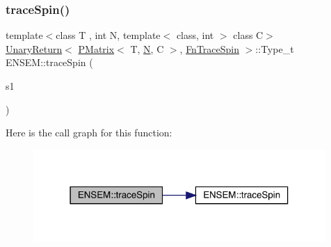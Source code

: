 \subsubsection{\texorpdfstring{traceSpin()}{traceSpin()}}
{\footnotesize\ttfamily template$<$class T , int N, template$<$ class, int $>$ class C$>$ \\
\mbox{\hyperlink{structENSEM_1_1UnaryReturn}{Unary\+Return}}$<$ \mbox{\hyperlink{classENSEM_1_1PMatrix}{P\+Matrix}}$<$ T, \mbox{\hyperlink{adat__devel_2lib_2hadron_2operator__name__util_8cc_a7722c8ecbb62d99aee7ce68b1752f337}{N}}, C $>$, \mbox{\hyperlink{structENSEM_1_1FnTraceSpin}{Fn\+Trace\+Spin}} $>$\+::Type\+\_\+t E\+N\+S\+E\+M\+::trace\+Spin (\begin{DoxyParamCaption}\item[{const \mbox{\hyperlink{classENSEM_1_1PMatrix}{P\+Matrix}}$<$ T, \mbox{\hyperlink{adat__devel_2lib_2hadron_2operator__name__util_8cc_a7722c8ecbb62d99aee7ce68b1752f337}{N}}, C $>$ \&}]{s1 }\end{DoxyParamCaption})\hspace{0.3cm}{\ttfamily [inline]}}

Here is the call graph for this function\+:\nopagebreak
\begin{figure}[H]
\begin{center}
\leavevmode
\includegraphics[width=315pt]{df/d0a/group__primmatrix_gaaf91f3c1c18cadfc208acd80fd80ab0b_cgraph}
\end{center}
\end{figure}
\mbox{\label{group__primmatrix_gabc920df179ac4bd2438224848ec237af}} 
